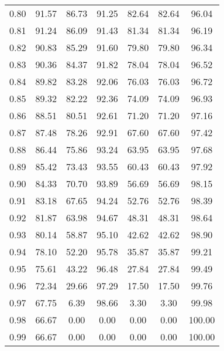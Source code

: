 \begin{tabular}{|c|c|c|c|c|c|c|}
      0.80 &     91.57 &     86.73 &      91.25 &   82.64 &      82.64 &         96.04 \\
      0.81 &     91.24 &     86.09 &      91.43 &   81.34 &      81.34 &         96.19 \\
      0.82 &     90.83 &     85.29 &      91.60 &   79.80 &      79.80 &         96.34 \\
      0.83 &     90.36 &     84.37 &      91.82 &   78.04 &      78.04 &         96.52 \\
      0.84 &     89.82 &     83.28 &      92.06 &   76.03 &      76.03 &         96.72 \\
      0.85 &     89.32 &     82.22 &      92.36 &   74.09 &      74.09 &         96.93 \\
      0.86 &     88.51 &     80.51 &      92.61 &   71.20 &      71.20 &         97.16 \\
      0.87 &     87.48 &     78.26 &      92.91 &   67.60 &      67.60 &         97.42 \\
      0.88 &     86.44 &     75.86 &      93.24 &   63.95 &      63.95 &         97.68 \\
      0.89 &     85.42 &     73.43 &      93.55 &   60.43 &      60.43 &         97.92 \\
      0.90 &     84.33 &     70.70 &      93.89 &   56.69 &      56.69 &         98.15 \\
      0.91 &     83.18 &     67.65 &      94.24 &   52.76 &      52.76 &         98.39 \\
      0.92 &     81.87 &     63.98 &      94.67 &   48.31 &      48.31 &         98.64 \\
      0.93 &     80.14 &     58.87 &      95.10 &   42.62 &      42.62 &         98.90 \\
      0.94 &     78.10 &     52.20 &      95.78 &   35.87 &      35.87 &         99.21 \\
      0.95 &     75.61 &     43.22 &      96.48 &   27.84 &      27.84 &         99.49 \\
      0.96 &     72.34 &     29.66 &      97.29 &   17.50 &      17.50 &         99.76 \\
      0.97 &     67.75 &      6.39 &      98.66 &    3.30 &       3.30 &         99.98 \\
      0.98 &     66.67 &      0.00 &       0.00 &    0.00 &       0.00 &        100.00 \\
      0.99 &     66.67 &      0.00 &       0.00 &    0.00 &       0.00 &        100.00 \\
\bottomrule
\end{tabular}
